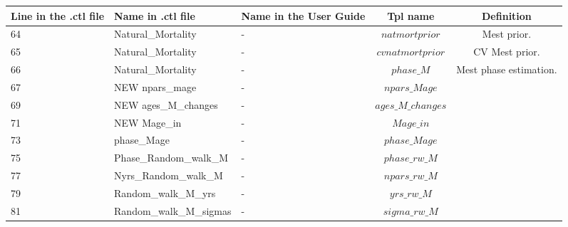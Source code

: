 \documentclass{article}
\begin{document}
\begin{tabular}{| p{0.9cm} | p{4.0cm}  | p{1.9cm} | c | c |}
\hline
Line in the .ctl file & Name in .ctl file  & Name in the User Guide & Tpl name & Definition\\ \hline
64 &  Natural\_Mortality  &  - & $natmortprior$ & Mest prior.
\\ \hline
65 &  Natural\_Mortality  &  - & $cvnatmortprior$ & CV Mest prior.\\ \hline
66 &  Natural\_Mortality  &  - & $phase\_M$  & Mest phase estimation.\\ \hline
67 &  NEW npars\_mage  & -  & $npars\_Mage$ & \\ \hline
69 &  NEW ages\_M\_changes  &  - & $ages\_M\_changes$ &\\ \hline
71 &  NEW Mage\_in  & -  & $Mage\_in$  &\\ \hline
73 &  phase\_Mage  & -  &  $phase\_Mage$ &\\ \hline
75 &  Phase\_Random\_walk\_M	  &  - & $phase\_rw\_M$ &\\ \hline
77 &  Nyrs\_Random\_walk\_M  &  - & $npars\_rw\_M$ &\\ \hline
79 &  Random\_walk\_M\_yrs	  & -  & $yrs\_rw\_M$ &\\ \hline
81 &  Random\_walk\_M\_sigmas  & -  & $sigma\_rw\_M$  &\\ \hline


\end{tabular}
\end{document}
